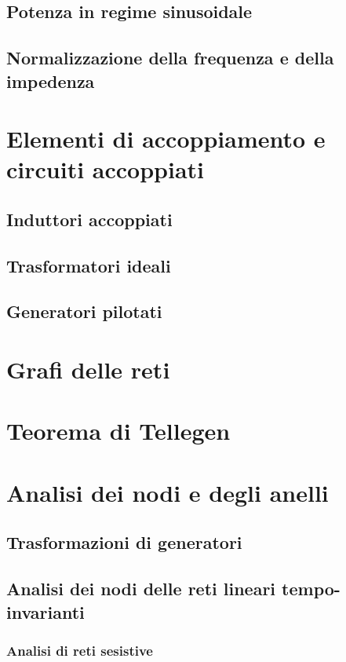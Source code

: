\documentclass[a4paper,12pt]{article}
\theoremstyle{mystyle}
\begin{document}
\subsection{Potenza in regime sinusoidale}

\subsection{Normalizzazione della frequenza e della impedenza}

\section{Elementi di accoppiamento e circuiti accoppiati}
\subsection{Induttori accoppiati}
\subsection{Trasformatori ideali}
\subsection{Generatori pilotati}

\section{Grafi delle reti}

\section{Teorema di Tellegen}

\section{Analisi dei nodi e degli anelli}
\subsection{Trasformazioni di generatori}
\subsection{Analisi dei nodi delle reti lineari tempo-invarianti}
\subsubsection{Analisi di reti sesistive}
\end{document}
